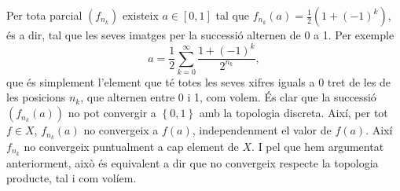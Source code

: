 \documentclass[12pt]{article}
\numberwithin{table}{section}
\numberwithin{figure}{section}
\numberwithin{equation}{section}
\newcommand{\set}[1]{\left\{ #1\right\}}
\begin{document}
Per tota parcial \( (f_{n_k}) \) existeix \( a \in [0,1] \) tal que \( f_{n_k}(a) = \tfrac{1}{2}(1 + (-1)^k) \), és a dir, tal que les seves imatges per la successió alternen de 0 a 1. Per exemple
\begin{equation*}
	a = \frac{1}{2} \sum_{k = 0}^\infty \frac{1 + (-1)^k}{2^{n_k}},
\end{equation*}
que és simplement l'element que té totes les seves xifres iguals a 0 tret de les de les posicions \( n_k \), que alternen entre 0 i 1, com volem. És clar que la successió \( (f_{n_k}(a)) \) no pot convergir a \( \set{0,1} \) amb la topologia discreta. Així, per tot \( f \in X \), \( f_{n_k}(a) \) no convergeix a \( f(a) \), independenment el valor de \( f(a) \). Així \( f_{n_k} \) no convergeix puntualment a cap element de \( X \). I pel que hem argumentat anteriorment, això és equivalent a dir que no convergeix respecte la topologia producte, tal i com volíem.  
\end{document}
